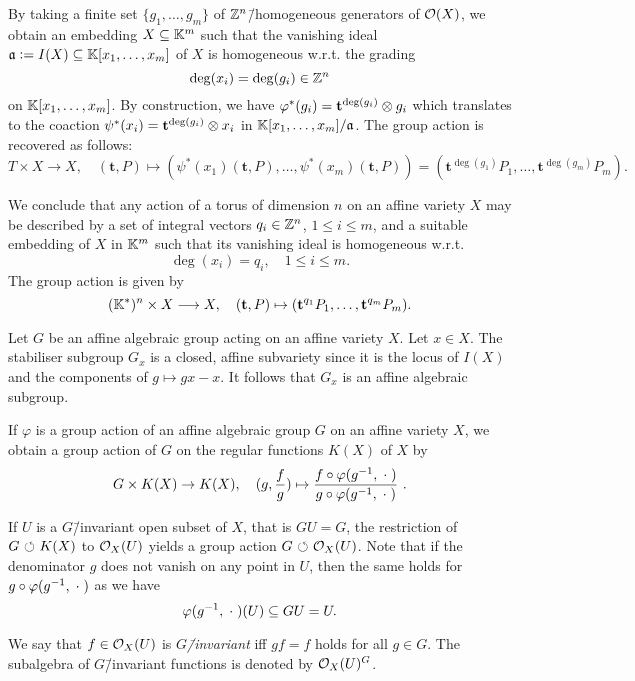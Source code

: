 \begin{construction}
	By taking a finite set $\{g_1,\dots,g_m\}$ of $\mathbb{Z}^n$\=/homogeneous generators of $\mathcal{O}(X)$, we obtain an embedding $X\subseteq\mathbb{K}^m$ such that the vanishing ideal $\mathfrak{a} \mathrel{\mathop:}= I(X)\subseteq\mathbb{K}[x_1,\dots,x_m]$ of $X$ is homogeneous w.r.t. the grading
	$$\deg(x_i) = \deg(g_i)\in\mathbb{Z}^n$$
	on $\mathbb{K}[x_1,\dots,x_m]$.
	By construction, we have $\varphi^*(g_i) = \mathbf{t}^{\deg(g_i)} \otimes g_i$ which translates to the coaction  $\psi^*(x_i) = \mathbf{t}^{\deg(g_i)} \otimes x_i$ in $\mathbb{K}[x_1,\dots,x_m] / \mathfrak{a}$.
	The group action is recovered as follows:
	$$T \times X \longrightarrow X,\quad (\mathbf{t},P) \mapsto (\psi^*(x_1)(\mathbf{t},P),\dots,\psi^*(x_m)(\mathbf{t},P)) = (\mathbf{t}^{\deg(g_1)}P_1,\dots,\mathbf{t}^{\deg(g_m)}P_m).$$
	
	We conclude that any action of a torus of dimension $n$ on an affine variety $X$ may be described by a set of integral vectors $q_i\in\mathbb{Z}^n$, $1\leq i \leq m$, and a suitable embedding of $X$ in $\mathbb{K}^m$ such that its vanishing ideal is homogeneous w.r.t.
	$$\deg(x_i) = q_i,\quad 1\leq i \leq m.$$
	The group action is given by
	$$(\mathbb{K}^*)^n \times X \longrightarrow X,\quad (\mathbf{t},P) \mapsto (\mathbf{t}^{q_1}P_1,\dots,\mathbf{t}^{q_m}P_m).$$
\end{construction}

\begin{remark}
	Let $G$ be an affine algebraic group acting on an affine variety $X$. Let $x\in X$. The stabiliser subgroup $G_x$ is a closed, affine subvariety since it is the locus of $I(X)$ and the components of $g\mapsto gx - x$. It follows that $G_x$ is an affine algebraic subgroup.
\end{remark}

\begin{remark}
	If $\varphi$ is a group action of an affine algebraic group $G$ on an affine variety $X$, we obtain a group action of $G$ on the regular functions $K(X)$ of $X$ by
	$$G\times K(X)\rightarrow K(X), \quad(g,\frac{f}{g}) \mapsto \frac{f\circ \varphi(g^{-1},\wildcard)}{g\circ \varphi(g^{-1},\wildcard)}\ .$$
	
	If $U$ is a $G$\=/invariant open subset of $X$, that is $GU = G$, the restriction of $G{\ \circlearrowleft\ } K(X)$ to $\mathcal{O}_X(U)$ yields a group action $G{\ \circlearrowleft\ }\mathcal{O}_X(U)$. Note that if the denominator $g$ does not vanish on any point in $U$, then the same holds for $g\circ \varphi(g^{-1},\mathrel{\;\cdot\;})$ as we have $$\varphi(g^{-1},\mathrel{\;\cdot\;})(U) \subseteq GU = U.$$
	
	We say that $f\in\mathcal{O}_X(U)$ is \emph{$G$\=/invariant} iff $gf = f$ holds for all $g\in G$. The subalgebra of $G$\=/invariant functions is denoted by $\mathcal{O}_X(U)^G$.
\end{remark}

